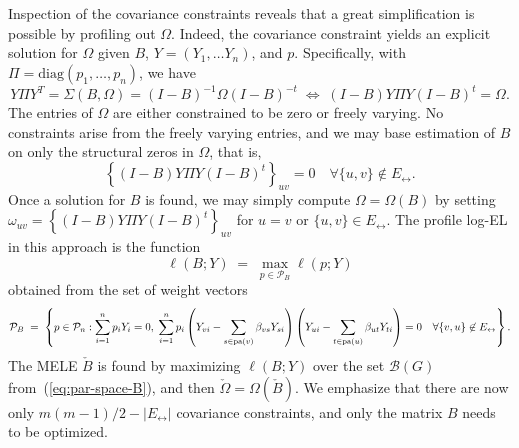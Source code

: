 \documentclass[notitlepage]{article}
\newcommand{\pa}{{\rm pa}}       %
\begin{document}
Inspection of the covariance constraints reveals that a great
simplification is possible by profiling out $\Omega$.  Indeed, the
covariance constraint yields an explicit solution for $\Omega$ given
$B$, $Y = (Y_1, \ldots Y_n)$, and $p$.  Specifically, with
$\Pi=\text{diag}(p_1,\dots,p_n)$, we have
\begin{equation}
  \label{eq:equiv-equations}
Y\Pi Y^T = \Sigma(B,\Omega) = (I - B)^{-1} \Omega(I - B)^{-t} \;\iff\; (I - B)Y \Pi Y(I-B)^{t} = \Omega.
\end{equation}
The entries of $\Omega$ are either constrained to be zero or freely
varying.  No constraints arise from the freely varying entries, and we
may base estimation of $B$ on only the structural zeros in $\Omega$,
that is,
\[\left\{(I - B)Y \Pi Y(I-B)^{t}\right\}_{uv} = 0 \quad \forall \{u,v\} \not \in E_\leftrightarrow.\]
Once a solution for $B$ is found, we may simply compute
$\Omega=\Omega(B)$ by setting
$
\omega_{uv} = \left\{(I - B)Y \Pi Y(I-B)^{t}\right\}_{uv}
$
for $u=v$ or $\{u,v\}\in E_\leftrightarrow$.  The profile log-EL in this approach
is the function
\begin{equation}
\ell(B;Y) \;=\; \max_{p\in\mathcal{P}_B}
\ell(p;Y)\label{eq:profile:inner}
\end{equation}
obtained from the set of weight vectors
\begin{equation}
\mathcal{P}_B \;=\; \left\{p\in\mathcal{P}_n:  \sum_{i=1}^n
  p_i Y_i  = 0, \; \sum_{i=1}^n p_i \left(Y_{vi} - \sum_{s \in
    \pa(v)}\beta_{vs}Y_{si}\right) \left(Y_{ui} - \sum_{t \in
    \pa(u)}\beta_{ut}Y_{ti}\right) = 0 \quad \forall\{v,u\} \not \in
  E_\leftrightarrow \right\}.\label{eq:profiled}
\end{equation}
The MELE $\check B$ is found by maximizing $\ell(B;Y)$ over the set
$\mathcal{B}(G)$ from~(\ref{eq:par-space-B}), and then
$\check\Omega=\Omega(\check B)$.  We emphasize that there are now only
$m(m - 1)/2 - |E_\leftrightarrow|$ covariance constraints, and only
the matrix $B$ needs to be optimized.
\end{document}
